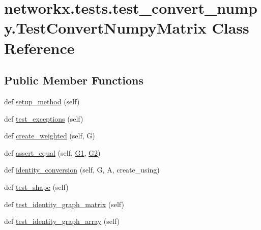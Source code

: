 \hypertarget{classnetworkx_1_1tests_1_1test__convert__numpy_1_1TestConvertNumpyMatrix}{}\section{networkx.\+tests.\+test\+\_\+convert\+\_\+numpy.\+Test\+Convert\+Numpy\+Matrix Class Reference}
\label{classnetworkx_1_1tests_1_1test__convert__numpy_1_1TestConvertNumpyMatrix}
\subsection*{Public Member Functions}
\begin{DoxyCompactItemize}
\item 
def \hyperlink{classnetworkx_1_1tests_1_1test__convert__numpy_1_1TestConvertNumpyMatrix_a2796225311b64d12698b18b3f38260d1}{setup\+\_\+method} (self)
\item 
def \hyperlink{classnetworkx_1_1tests_1_1test__convert__numpy_1_1TestConvertNumpyMatrix_a347a16cb6503c667f4d4a8eef798dfa5}{test\+\_\+exceptions} (self)
\item 
def \hyperlink{classnetworkx_1_1tests_1_1test__convert__numpy_1_1TestConvertNumpyMatrix_a0035faece6575d982d35c0f37f90c757}{create\+\_\+weighted} (self, G)
\item 
def \hyperlink{classnetworkx_1_1tests_1_1test__convert__numpy_1_1TestConvertNumpyMatrix_ac9345c35a87330229010d033241d8af7}{assert\+\_\+equal} (self, \hyperlink{classnetworkx_1_1tests_1_1test__convert__numpy_1_1TestConvertNumpyMatrix_a5363607f63572ed6e00951d9c6787702}{G1}, \hyperlink{classnetworkx_1_1tests_1_1test__convert__numpy_1_1TestConvertNumpyMatrix_a73e5b82acc8a1295d09a508b2fc9fe20}{G2})
\item 
def \hyperlink{classnetworkx_1_1tests_1_1test__convert__numpy_1_1TestConvertNumpyMatrix_ae8e457a301d06e748b980a82d7efa09a}{identity\+\_\+conversion} (self, G, A, create\+\_\+using)
\item 
def \hyperlink{classnetworkx_1_1tests_1_1test__convert__numpy_1_1TestConvertNumpyMatrix_a901fd36e9a09e0bff3320925ed5f93e0}{test\+\_\+shape} (self)
\item 
def \hyperlink{classnetworkx_1_1tests_1_1test__convert__numpy_1_1TestConvertNumpyMatrix_a222aa9a5926e336ffb82e3720d984f16}{test\+\_\+identity\+\_\+graph\+\_\+matrix} (self)
\item 
def \hyperlink{classnetworkx_1_1tests_1_1test__convert__numpy_1_1TestConvertNumpyMatrix_a71c3b04d1e930b8e32244ac90265f456}{test\+\_\+identity\+\_\+graph\+\_\+array} (self)

\end{DoxyCompactItemize}
